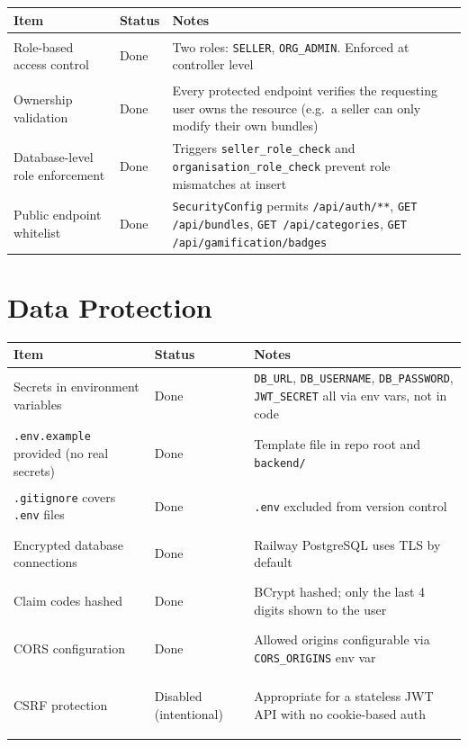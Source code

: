 \documentclass[]{report}
\newcommand{\done}{\colorbox{done}{\strut Done}}
\newcommand{\disabled}{\colorbox{partial}{\strut Disabled (intentional)}}
\begin{document}
\begin{longtable}{|p{4.5cm}|p{2.5cm}|p{7cm}|}
\hline
\textbf{Item} & \textbf{Status} & \textbf{Notes} \\
\hline
Role-based access control & \done & Two roles: \texttt{SELLER}, \texttt{ORG\_ADMIN}. Enforced at controller level \\
\hline
Ownership validation & \done & Every protected endpoint verifies the requesting user owns the resource (e.g.\ a seller can only modify their own bundles) \\
\hline
Database-level role enforcement & \done & Triggers \texttt{seller\_role\_check} and \texttt{organisation\_role\_check} prevent role mismatches at insert \\
\hline
Public endpoint whitelist & \done & \texttt{SecurityConfig} permits \texttt{/api/auth/**}, \texttt{GET /api/bundles}, \texttt{GET /api/categories}, \texttt{GET /api/gamification/badges} \\
\hline
\end{longtable}

\section*{Data Protection}

\begin{longtable}{|p{4.5cm}|p{2.5cm}|p{7cm}|}
\hline
\textbf{Item} & \textbf{Status} & \textbf{Notes} \\
\hline
Secrets in environment variables & \done & \texttt{DB\_URL}, \texttt{DB\_USERNAME}, \texttt{DB\_PASSWORD}, \texttt{JWT\_SECRET} all via env vars, not in code \\
\hline
\texttt{.env.example} provided (no real secrets) & \done & Template file in repo root and \texttt{backend/} \\
\hline
\texttt{.gitignore} covers \texttt{.env} files & \done & \texttt{.env} excluded from version control \\
\hline
Encrypted database connections & \done & Railway PostgreSQL uses TLS by default \\
\hline
Claim codes hashed & \done & BCrypt hashed; only the last 4 digits shown to the user \\
\hline
CORS configuration & \done & Allowed origins configurable via \texttt{CORS\_ORIGINS} env var \\
\hline
CSRF protection & \disabled & Appropriate for a stateless JWT API with no cookie-based auth \\
\hline
\end{longtable}
\end{document}
